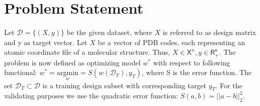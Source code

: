 \section{Problem Statement}
Let $\mathcal{D} = \{(X, y)\}$ be the given dataset, where $X$ is referred to as design matrix and y as target vector. Let $X$ be a vector of PDB codes, each representing an atomic coordinate file of a molecular structure. Thus, $X \in \mathsf{X}^n, y \in \mathsf{R_+^n}$. The problem is now defined as optimizing model $w^*$ with respect to following functional: $w^* = \underset{w}{\mathrm{argmin}} = S(w(\mathcal{D}_T), y_T)$, where S is the error function. The set $\mathcal{D}_T \subset \mathcal{D}$ is a training design subset with corresponding target $y_T$. For the validating purposes we use the quadratic error function: $S(a, b) = ||a-b||_2^2$.